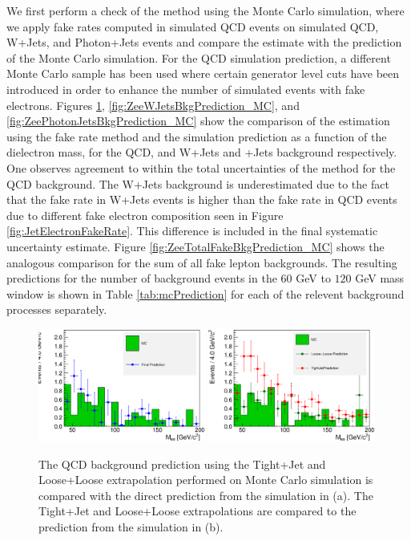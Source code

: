 \documentclass{cmspaper}
\begin{document}

We first perform a check of the method using the Monte Carlo simulation, where we apply fake rates computed in simulated QCD events on simulated QCD, W+Jets, and Photon+Jets events and compare the estimate with the prediction of the Monte Carlo simulation. For the QCD simulation prediction, a different Monte Carlo sample has been used where certain generator level cuts have been introduced in order to enhance the number of simulated events with fake electrons. Figures \ref{fig:ZeeQCDBkgPrediction_MC}, \ref{fig:ZeeWJetsBkgPrediction_MC}, and \ref{fig:ZeePhotonJetsBkgPrediction_MC} show the comparison of the estimation using the fake rate method and the simulation prediction as a function of the dielectron mass, for the QCD, and W+Jets and \GAM+Jets background respectively. One observes agreement to within the total uncertainties of the method for the QCD background. The W+Jets background is underestimated due to the fact that the fake rate in W+Jets events is higher than the fake rate in QCD events due to different fake electron composition seen in Figure \ref{fig:JetElectronFakeRate}. This difference is included in the final systematic uncertainty estimate. Figure \ref{fig:ZeeTotalFakeBkgPrediction_MC} shows the analogous comparison for the sum of all fake lepton backgrounds. The resulting predictions for the number of background events in the $60$ GeV to $120$ GeV mass window is shown in Table \ref{tab:mcPrediction} for each of the relevent background processes separately. 



\begin{figure}[htb]
\begin{center}
\includegraphics[width=0.49\textwidth]{MCBkgFakeRatePrediction_QCD_FinalVsMC.eps}
\includegraphics[width=0.49\textwidth]{MCBkgFakeRatePrediction_QCD_LooseLooseTightJetVsMC.eps}
   \caption{The QCD background prediction using the Tight+Jet and Loose+Loose extrapolation performed on Monte Carlo simulation is compared with the direct prediction from the simulation in (a). The Tight+Jet and Loose+Loose extrapolations are compared to the prediction from the simulation in (b). }
   \label{fig:ZeeQCDBkgPrediction_MC}
\end{center}
\end{figure}
\end{document}
